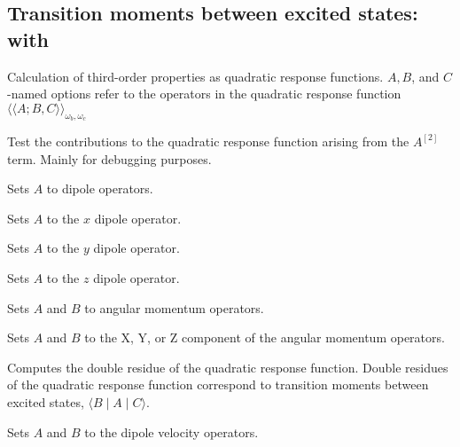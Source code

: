 \subsection{Transition moments between excited states:  with }

Calculation of third-order properties as quadratic response
functions.
$A,B$, and $C$-named options refer to the operators in the quadratic
response function
$\langle\!\langle A;B,C \rangle\!\rangle_{\omega_b,\omega_c}$
\cite{ovhapjhjajthjojcp97,hhhjajpjjojcp97,haovhkpjthjcp98}

\begin{description}

\item{}
Test the contributions to the quadratic response function arising from
the $A^{\left[2\right]}$ term. Mainly for debugging purposes.

\item{}
Sets $A$ to dipole operators.

\item{}
Sets $A$ to the $x$ dipole operator.

\item{}
Sets $A$ to the $y$ dipole operator.

\item{}
Sets $A$ to the $z$ dipole operator.

\item{}
Sets $A$ and $B$ to angular momentum operators.

\item{}
Sets $A$ and $B$ to the X, Y, or Z component of the angular momentum operators.

\item{}
Computes the double residue
of the quadratic
response function.
Double residues of the quadratic response function correspond to transition
moments between excited states,
$\langle B \mid A \mid C \rangle$.

\item{}
Sets $A$ and $B$ to the dipole velocity operators.


\end{description}
